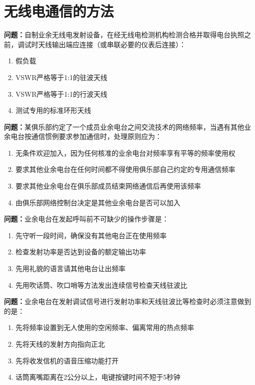 \chapter{无线电通信的方法}




\noindent\textbf{问题：}自制业余无线电发射设备，在经无线电检测机构检测合格并取得电台执照之前，调试时天线输出端应连接（或串联必要的仪表后连接）：
\begin{enumerate}[label=\Alph*), leftmargin=3em]
\item 假负载
\item VSWR严格等于1:1的驻波天线
\item VSWR严格等于1:1的行波天线
\item 测试专用的标准环形天线
\end{enumerate}

\bigskip


\noindent\textbf{问题：}某俱乐部约定了一个成员业余电台之间交流技术的网络频率，当遇有其他业余电台按通信惯例要求参加通信时，处理原则应为：
\begin{enumerate}[label=\Alph*), leftmargin=3em]
\item 无条件欢迎加入，因为任何核准的业余电台对频率享有平等的频率使用权
\item 要求其他业余电台在任何时间都不得使用俱乐部自己约定的专用通信频率
\item 要求其他业余电台在俱乐部成员结束网络通信后再使用该频率
\item 由俱乐部网络控制台决定是其他业余电台是否可以加入
\end{enumerate}

\bigskip


\noindent\textbf{问题：}业余电台在发起呼叫前不可缺少的操作步骤是：
\begin{enumerate}[label=\Alph*), leftmargin=3em]
\item 先守听一段时间，确保没有其他电台正在使用频率
\item 检查发射功率是否达到设备的额定输出功率
\item 先用礼貌的语言请其他电台让出频率
\item 先用吹话筒、吹口哨等方法发出连续信号检查天线驻波比
\end{enumerate}

\bigskip


\noindent\textbf{问题：}业余电台在发射调试信号进行发射功率和天线驻波比等检查时必须注意做到的是：
\begin{enumerate}[label=\Alph*), leftmargin=3em]
\item 先将频率设置到无人使用的空闲频率、偏离常用的热点频率
\item 先将天线的发射方向指向正北
\item 先将收发信机的语音压缩功能打开
\item 话筒离嘴距离在2公分以上，电键按键时间不短于5秒钟
\end{enumerate}

